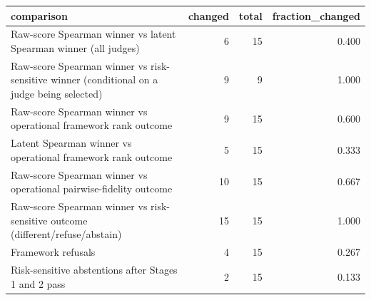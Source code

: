\begin{tabular}{lrrr}
\toprule
comparison & changed & total & fraction\_changed \\
\midrule
Raw-score Spearman winner vs latent Spearman winner (all judges) & 6 & 15 & 0.400 \\
Raw-score Spearman winner vs risk-sensitive winner (conditional on a judge being selected) & 9 & 9 & 1.000 \\
Raw-score Spearman winner vs operational framework rank outcome & 9 & 15 & 0.600 \\
Latent Spearman winner vs operational framework rank outcome & 5 & 15 & 0.333 \\
Raw-score Spearman winner vs operational pairwise-fidelity outcome & 10 & 15 & 0.667 \\
Raw-score Spearman winner vs risk-sensitive outcome (different/refuse/abstain) & 15 & 15 & 1.000 \\
Framework refusals & 4 & 15 & 0.267 \\
Risk-sensitive abstentions after Stages 1 and 2 pass & 2 & 15 & 0.133 \\
\bottomrule
\end{tabular}
